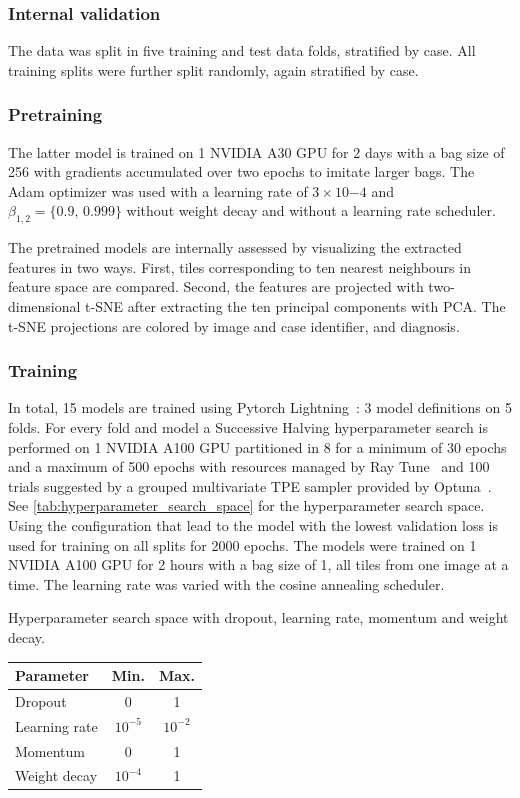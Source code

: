 \subsubsection{Internal validation}
The data was split in five training and test data folds, stratified by case.
All training splits were further split randomly, again stratified by case.

\subsubsection{Pretraining}
The latter model is trained on 1 NVIDIA A30 GPU for 2 days with a bag size of 256 with gradients accumulated over two epochs to imitate larger bags.
The Adam optimizer was used with a learning rate of $3\times 10{-4}$ and $\beta_{1,2} = \{0.9,\, 0.999\}$ without weight decay and without a learning rate scheduler.

The pretrained models are internally assessed by visualizing the extracted features in two ways.
First, tiles corresponding to ten nearest neighbours in feature space are compared.
Second, the features are projected with two-dimensional t-SNE after extracting the ten principal components with PCA.
The t-SNE projections are colored by image and case identifier, and diagnosis.

\subsubsection{Training}
In total, 15 models are trained using Pytorch Lightning~\cite{Falcon2019}: 3 model definitions on 5 folds.
For every fold and model a Successive Halving hyperparameter search is performed on 1 NVIDIA A100 GPU partitioned in 8 for a minimum of 30 epochs and a maximum of 500 epochs with resources managed by Ray Tune~\cite{Liaw2018} and 100 trials suggested by a grouped multivariate TPE sampler provided by Optuna~\cite{Akiba2019}.
See \cref{tab:hyperparameter_search_space} for the hyperparameter search space.
Using the configuration that lead to the model with the lowest validation loss is used for training on all splits for 2000 epochs.
The models were trained on 1 NVIDIA A100 GPU for 2 hours with a bag size of 1, \ie all tiles from one image at a time.
The learning rate was varied with the cosine annealing scheduler.

\begin{margintable}
    \caption[Hyperparameter search space]{
        Hyperparameter search space with dropout, learning rate, momentum and weight decay.
    }
    \label{tab:hyperparameter_search_space}
    \begin{tabular}{lcc}
        \toprule
        Parameter &  Min. & Max. \\
        \midrule
        Dropout & 0 & 1 \\
        Learning rate & $10^{-5}$ & $10^{-2}$ \\
        Momentum & 0 & 1 \\
        Weight decay & $10^{-4}$ & 1 \\
        \bottomrule
    \end{tabular}
\end{margintable}


